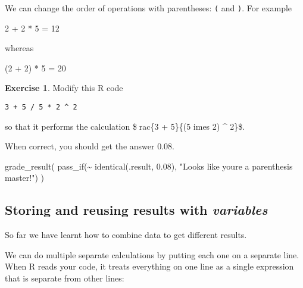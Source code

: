 \documentclass[
]{article}
\newenvironment{Shaded}{\begin{snugshade}}{\end{snugshade}}
\newcommand{\DecValTok}[1]{\textcolor[rgb]{0.00,0.00,0.81}{#1}}
\newcommand{\FloatTok}[1]{\textcolor[rgb]{0.00,0.00,0.81}{#1}}
\newcommand{\FunctionTok}[1]{\textcolor[rgb]{0.00,0.00,0.00}{#1}}
\newcommand{\NormalTok}[1]{#1}
\newcommand{\OtherTok}[1]{\textcolor[rgb]{0.56,0.35,0.01}{#1}}
\newcommand{\SpecialCharTok}[1]{\textcolor[rgb]{0.00,0.00,0.00}{#1}}
\newcommand{\StringTok}[1]{\textcolor[rgb]{0.31,0.60,0.02}{#1}}
\theoremstyle{definition}
\theoremstyle{definition}
\theoremstyle{definition}
\newtheorem{exercise}{Exercise}[section]
\theoremstyle{definition}
\theoremstyle{remark}
\begin{document}
We can change the order of operations with parentheses: \texttt{(} and \texttt{)}. For example

\begin{Shaded}
\begin{Highlighting}[]
\DecValTok{2} \SpecialCharTok{+} \DecValTok{2} \SpecialCharTok{*} \DecValTok{5} \OtherTok{=} \DecValTok{12}
\end{Highlighting}
\end{Shaded}

whereas

\begin{Shaded}
\begin{Highlighting}[]
\NormalTok{(}\DecValTok{2} \SpecialCharTok{+} \DecValTok{2}\NormalTok{) }\SpecialCharTok{*} \DecValTok{5} \OtherTok{=} \DecValTok{20}
\end{Highlighting}
\end{Shaded}

\begin{exercise}
Modify this R code

\texttt{3\ +\ 5\ /\ 5\ *\ 2\ \^{}\ 2}

so that it performs the calculation \$rac\{3 + 5\}\{(5 imes 2) \^{} 2\}\$.

When correct, you should get the answer 0.08.
\end{exercise}

\begin{Shaded}
\begin{Highlighting}[]
\FunctionTok{grade\_result}\NormalTok{(}
  \FunctionTok{pass\_if}\NormalTok{(}\SpecialCharTok{\textasciitilde{}} \FunctionTok{identical}\NormalTok{(.result, }\FloatTok{0.08}\NormalTok{), }\StringTok{"Looks like you\textquotesingle{}re a parenthesis master!"}\NormalTok{)}
\NormalTok{)}
\end{Highlighting}
\end{Shaded}

\hypertarget{storing-and-reusing-results-with-variables}{%
\subsection{\texorpdfstring{Storing and reusing results with \emph{variables}}{Storing and reusing results with variables}}\label{storing-and-reusing-results-with-variables}}

So far we have learnt how to combine data to get different results.

We can do multiple separate calculations by putting each one on a separate line. When R reads your code, it treats everything on one line as a single expression that is separate from other lines:
\end{document}
